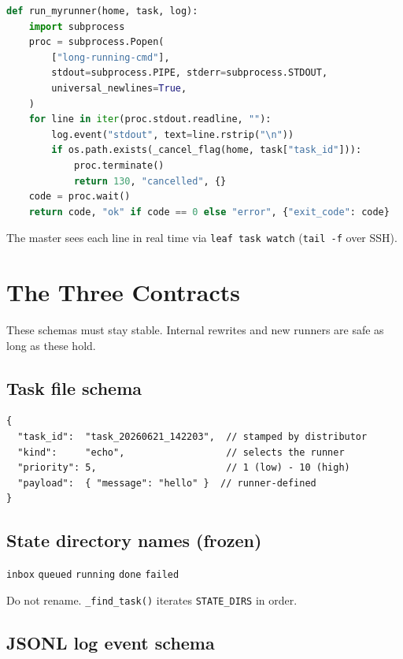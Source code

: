 \documentclass[11pt,a4paper]{article}
\begin{document}
\begin{lstlisting}[language=python]
def run_myrunner(home, task, log):
	import subprocess
	proc = subprocess.Popen(
		["long-running-cmd"],
		stdout=subprocess.PIPE, stderr=subprocess.STDOUT,
		universal_newlines=True,
	)
	for line in iter(proc.stdout.readline, ""):
		log.event("stdout", text=line.rstrip("\n"))
		if os.path.exists(_cancel_flag(home, task["task_id"])):
			proc.terminate()
			return 130, "cancelled", {}
	code = proc.wait()
	return code, "ok" if code == 0 else "error", {"exit_code": code}
\end{lstlisting}

The master sees each line in real time via \texttt{leaf task watch} (\texttt{tail -f} over SSH).

\section{The Three Contracts}

These schemas must stay stable. Internal rewrites and new runners are safe as
long as these hold.

\subsection{Task file schema}

\begin{lstlisting}[language={}]
{
  "task_id":  "task_20260621_142203",  // stamped by distributor
  "kind":     "echo",                  // selects the runner
  "priority": 5,                       // 1 (low) - 10 (high)
  "payload":  { "message": "hello" }  // runner-defined
}
\end{lstlisting}

\subsection{State directory names (frozen)}

\begin{center}
\texttt{inbox} \quad \texttt{queued} \quad \texttt{running} \quad
\texttt{done} \quad \texttt{failed}
\end{center}

Do not rename. \texttt{\_find\_task()} iterates \texttt{STATE\_DIRS} in order.

\subsection{JSONL log event schema}
\end{document}
